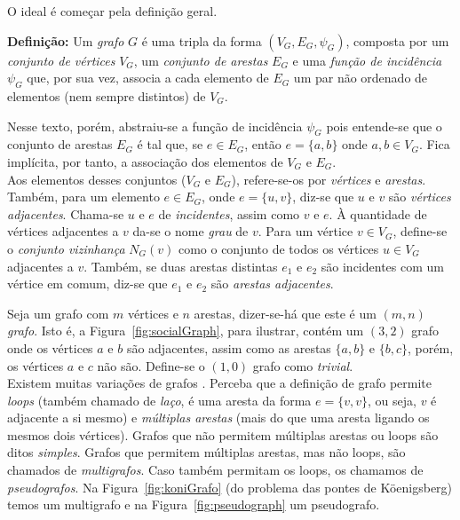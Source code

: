 O ideal é começar pela definição geral.

\begin{center}
	\begin{minipage}{0.9 \linewidth}
		\textbf{Definição:} Um \textit{grafo} $G$ é uma tripla da forma $(V_G,E_G, \psi_{G})$, composta por um \textit{conjunto de vértices} $V_G$, um \textit{conjunto de arestas} $E_G$ e uma \textit{função de incidência} $\psi_{G}$ que, por sua vez, associa a cada elemento de $E_G$ um par não ordenado de elementos (nem sempre distintos) de $V_G$.
	\end{minipage}
\end{center} 

Nesse texto, porém, abstraiu-se a função de incidência $\psi_G$ pois entende-se que o conjunto de arestas $E_G$ é tal que, se $e \in E_G$, então $e = \{a, b\}$ onde $a, b \in V_G$. Fica implícita, por tanto, a associação dos elementos de  $V_G$ e $E_G$.
\\

Aos elementos desses conjuntos ($V_G$ e $E_G$), refere-se-os por \textit{vértices} e \textit{arestas}. Também, para um elemento $e \in E_G$, onde $e = \{u, v\}$, diz-se que $u$ e $v$ são \textit{vértices adjacentes}. Chama-se $u$ e $e$ de \textit{incidentes}, assim como $v$ e $e$. À quantidade de vértices adjacentes a $v$ da-se o nome \textit{grau} de $v$. Para um vértice $v\in V_G$, define-se o \textit{conjunto vizinhança} $N_G(v)$ como o conjunto de todos os vértices $u\in V_G$ adjacentes a $v$. Também, se duas arestas distintas $e_1$ e $e_2$ são incidentes com um vértice em comum, diz-se que $e_1$ e $e_2$ são \textit{arestas adjacentes}. 

Seja um grafo com $m$ vértices e $n$ arestas, dizer-se-há que este é um $(m, n)$ \textit{grafo}. Isto é, a Figura~\ref{fig:socialGraph}, para ilustrar, contém um $(3,2)$ grafo onde os vértices $a$ e $b$ são adjacentes, assim como as arestas $\{a, b\}$ e $\{b, c\}$, porém, os vértices $a$ e $c$ não são.
Define-se o $(1,0)$ grafo como \textit{trivial}.
\\

Existem muitas variações de grafos \cite{graphTheoryFHarary}. Perceba que a definição de grafo permite \textit{loops} (também chamado de \textit{laço}, é uma aresta da forma $e = \{v,v\}$, ou seja, $v$ é adjacente a si mesmo) e \textit{múltiplas arestas} (mais do que uma aresta ligando os mesmos dois vértices). Grafos que não permitem múltiplas arestas ou loops são ditos \textit{simples}. Grafos que permitem múltiplas arestas, mas não loops, são chamados de \textit{multigrafos}. Caso também permitam os loops, os chamamos de \textit{pseudografos}. Na Figura~\ref{fig:koniGrafo} (do problema das pontes de Köenigsberg) temos um multigrafo e na Figura~\ref{fig:pseudograph} um pseudografo.

